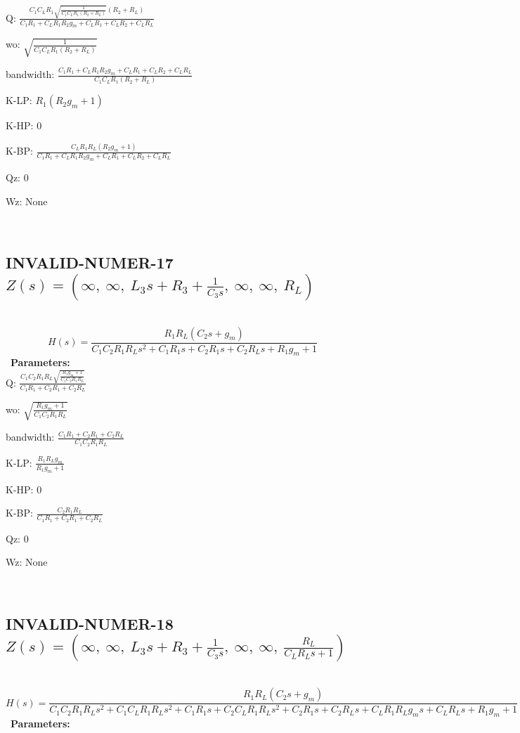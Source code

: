 \documentclass{article}
\begin{document}
Q: $\frac{C_{1} C_{L} R_{1} \sqrt{\frac{1}{C_{1} C_{L} R_{1} \left(R_{2} + R_{L}\right)}} \left(R_{2} + R_{L}\right)}{C_{1} R_{1} + C_{L} R_{1} R_{2} g_{m} + C_{L} R_{1} + C_{L} R_{2} + C_{L} R_{L}}$\ 

wo: $\sqrt{\frac{1}{C_{1} C_{L} R_{1} \left(R_{2} + R_{L}\right)}}$\ 

bandwidth: $\frac{C_{1} R_{1} + C_{L} R_{1} R_{2} g_{m} + C_{L} R_{1} + C_{L} R_{2} + C_{L} R_{L}}{C_{1} C_{L} R_{1} \left(R_{2} + R_{L}\right)}$\ 

K-LP: $R_{1} \left(R_{2} g_{m} + 1\right)$\ 

K-HP: $0$\ 

K-BP: $\frac{C_{L} R_{1} R_{L} \left(R_{2} g_{m} + 1\right)}{C_{1} R_{1} + C_{L} R_{1} R_{2} g_{m} + C_{L} R_{1} + C_{L} R_{2} + C_{L} R_{L}}$\ 

Qz: $0$\ 

Wz: $\text{None}$\ 

\ 

\subsection{INVALID-NUMER-17 $Z(s) = \left( \infty, \  \infty, \  L_{3} s + R_{3} + \frac{1}{C_{3} s}, \  \infty, \  \infty, \  R_{L}\right)$ } \ 
\textbf{\[H(s) = \frac{R_{1} R_{L} \left(C_{2} s + g_{m}\right)}{C_{1} C_{2} R_{1} R_{L} s^{2} + C_{1} R_{1} s + C_{2} R_{1} s + C_{2} R_{L} s + R_{1} g_{m} + 1}\] } \ 
\textbf{Parameters:}\\ 

Q: $\frac{C_{1} C_{2} R_{1} R_{L} \sqrt{\frac{R_{1} g_{m} + 1}{C_{1} C_{2} R_{1} R_{L}}}}{C_{1} R_{1} + C_{2} R_{1} + C_{2} R_{L}}$\ 

wo: $\sqrt{\frac{R_{1} g_{m} + 1}{C_{1} C_{2} R_{1} R_{L}}}$\ 

bandwidth: $\frac{C_{1} R_{1} + C_{2} R_{1} + C_{2} R_{L}}{C_{1} C_{2} R_{1} R_{L}}$\ 

K-LP: $\frac{R_{1} R_{L} g_{m}}{R_{1} g_{m} + 1}$\ 

K-HP: $0$\ 

K-BP: $\frac{C_{2} R_{1} R_{L}}{C_{1} R_{1} + C_{2} R_{1} + C_{2} R_{L}}$\ 

Qz: $0$\ 

Wz: $\text{None}$\ 

\ 

\subsection{INVALID-NUMER-18 $Z(s) = \left( \infty, \  \infty, \  L_{3} s + R_{3} + \frac{1}{C_{3} s}, \  \infty, \  \infty, \  \frac{R_{L}}{C_{L} R_{L} s + 1}\right)$ } \ 
\textbf{\[H(s) = \frac{R_{1} R_{L} \left(C_{2} s + g_{m}\right)}{C_{1} C_{2} R_{1} R_{L} s^{2} + C_{1} C_{L} R_{1} R_{L} s^{2} + C_{1} R_{1} s + C_{2} C_{L} R_{1} R_{L} s^{2} + C_{2} R_{1} s + C_{2} R_{L} s + C_{L} R_{1} R_{L} g_{m} s + C_{L} R_{L} s + R_{1} g_{m} + 1}\] } \ 
\textbf{Parameters:}\\ 
\end{document}
